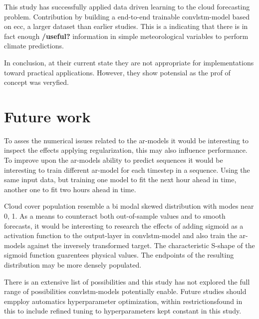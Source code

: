 This study has successfully applied data driven learning to the cloud forecasting problem. Contribution by building a end-to-end trainable \acrshort{convlstm}-model based on \acrshort{ecc}, a larger dataset than earlier studies. This is a indicating that there is in fact enough \textbf{/useful?} information in simple meteorological variables to perform climate predictions. 

In conclusion, at their current state they are not appropriate for implementations toward practical applications. However, they show potensial as the prof of concept was veryfied.

\section{Future work}
To asses the numerical issues related to the \acrshort{ar}-models it would be interesting to inspect the effects applying regularization, this may also influence performance. To improve upon the \acrshort{ar}-models ability to predict sequences it would be interesting to train different \acrshort{ar}-model for each timestep in a sequence. Using the same input data, but training one model to fit the next hour ahead in time, another one to fit two hours ahead in time.

Cloud cover population resemble a bi modal skewed distribution with modes near 0, 1. As a means to counteract both out-of-sample values and to smooth forecasts, it would be interesting to research the effects of adding sigmoid as a activation function to the output-layer in \acrshort{convlstm}-model and also train the \acrshort{ar}-models against
the inversely transformed target. The characteristic S-shape of the sigmoid function guarentees physical values. The endpoints of the resulting distribution may be more densely populated. 

There is an extensive list of possibilities and this study has not explored the full range of possibilities \acrshort{convlstm}-models potentially enable. Future studies should empploy automatics hyperparameter optimization, within restrictionsfound in this to include refined tuning to hyperparameters kept constant in this study.


